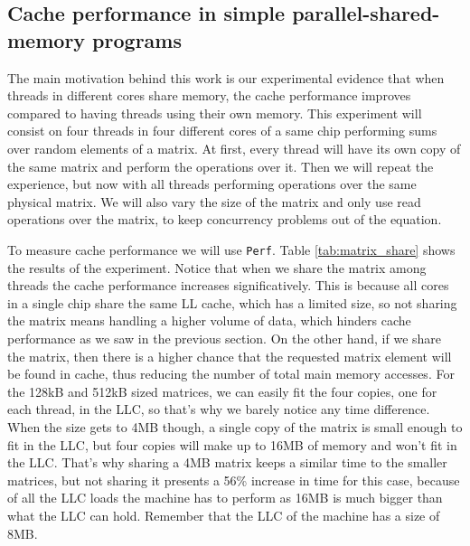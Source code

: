 \documentclass[12pt]{diicc}
\begin{document}
\subsection{Cache performance in simple parallel-shared-memory programs}

The main motivation behind this work is our experimental evidence that when threads in different cores share memory, the cache performance improves compared to having threads using their own memory. This experiment will consist on four threads in four different cores of a same chip performing sums over random elements of a matrix. At first, every thread will have its own copy of the same matrix and perform the operations over it. Then we will repeat the experience, but now with all threads performing operations over the same physical matrix. We will also vary the size of the matrix and only use read operations over the matrix, to keep concurrency problems out of the equation.

To measure cache performance we will use \texttt{Perf}. Table \ref{tab:matrix_share} shows the results of the experiment. Notice that when we share the matrix among threads the cache performance increases significatively. This is because all cores in a single chip share the same LL cache, which has a limited size, so not sharing the matrix means handling a higher volume of data, which hinders cache performance as we saw in the previous section. On the other hand, if we share the matrix, then there is a higher chance that the requested matrix element will be found in cache, thus reducing the number of total main memory accesses. For the 128kB and 512kB sized matrices, we can easily fit the four copies, one for each thread, in the LLC, so that's why we barely notice any time difference. When the size gets to 4MB though, a single copy of the matrix is small enough to fit in the LLC, but four copies will make up to 16MB of memory and won't fit in the LLC. That's why sharing a 4MB matrix keeps a similar time to the smaller matrices, but not sharing it presents a 56\% increase in time for this case, because of all the LLC loads the machine has to perform as 16MB is much bigger than what the LLC can hold. Remember that the LLC of the machine has a size of 8MB.
\end{document}
